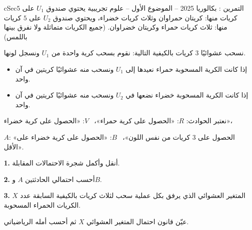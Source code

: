 \documentclass[12pt,a4paper]{article}
\newenvironment{BOX}[2]{\begin{otherlanguage}{english}\begin{arbox}{#1}{#2}}{\end{arbox}\end{otherlanguage}}
\newcounter{exo}
\newenvironment{tamrin}[1]{\stepcounter{exo}\begin{BOX}{cSec}{التمرين \theexo: #1}}{\end{BOX}}
\newenvironment{LTR}{\begin{otherlanguage}{english}}{\end{otherlanguage}}
\renewcommand{\ldots}{\mathinner{\ldotp\ldotp\ldotp}}
\newcommand{\QQ}[1]{\par\smallskip\textbf{#1.} }
\begin{document}
\begin{tamrin}{بكالوريا 2025 -- الموضوع الأول -- علوم تجريبية}
يحتوي صندوق $U_1$ على $5$ كريات منها: كريتان حمراوان وثلاث كريات خضراء، ويحتوي صندوق $U_2$ على $5$ كريات منها: ثلاث كريات حمراء وكريتان خضراوان. (جميع الكريات متماثلة ولا نفرق بينها باللمس)

نسحب عشوائيًا $3$ كريات بالكيفية التالية: نقوم بسحب كرية واحدة من $U_1$ ونسجل لونها.
\begin{itemize}
\item إذا كانت الكرية المسحوبة حمراء نعيدها إلى $U_1$ ونسحب منه عشوائيًا كريتين في آن واحد.
\item إذا كانت الكرية المسحوبة خضراء نضعها في $U_2$ ونسحب منه عشوائيًا كريتين في آن واحد.
\end{itemize}
نعتبر الحوادث: $R$: «الحصول على كرية حمراء»، \ $V$: «الحصول على كرية خضراء»،

$A$: «الحصول على $3$ كريات من نفس اللون»، \ $B$: «الحصول على كرية خضراء على الأقل».

\begin{center}\begin{LTR}\end{LTR}\end{center}
\QQ{1} أنقل وأكمل شجرة الاحتمالات المقابلة.
\QQ{2} أحسب احتمالي الحادثتين $A$ و$B$.
\QQ{3} $X$ المتغير العشوائي الذي يرفق بكل عملية سحب لثلاث كريات بالكيفية السابقة عدد الكريات الحمراء المسحوبة.

عيّن قانون احتمال المتغير العشوائي $X$ ثم أحسب أمله الرياضياتي.
\end{tamrin}
\end{document}
